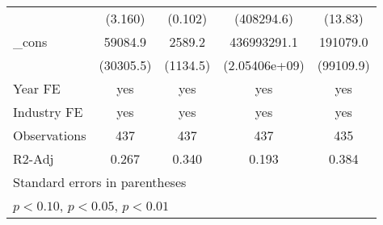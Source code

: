 \begin{table}[htbp]
\begin{tabular}{l*{4}{c}}
                    &     (3.160)         &     (0.102)         &  (408294.6)         &     (13.83)         \\
\_cons              &     59084.9\sym{*}  &      2589.2\sym{**} & 436993291.1         &    191079.0\sym{*}  \\
                    &   (30305.5)         &    (1134.5)         &(2.05406e+09)         &   (99109.9)         \\
\hline
Year FE             &         yes         &         yes         &         yes         &         yes         \\
Industry FE         &         yes         &         yes         &         yes         &         yes         \\
Observations        &         437         &         437         &         437         &         435         \\
R2-Adj              &       0.267         &       0.340         &       0.193         &       0.384         \\
\hline\hline
\multicolumn{5}{l}{\footnotesize Standard errors in parentheses}\\
\multicolumn{5}{l}{\footnotesize \sym{*} \(p<0.10\), \sym{**} \(p<0.05\), \sym{***} \(p<0.01\)}\\
\end{tabular}
\end{table}
